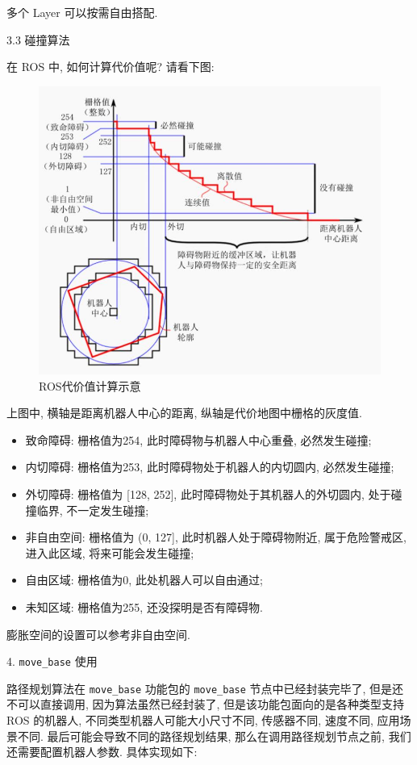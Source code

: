 \documentclass[openany, fontset=windowsold]{ctexbook}
\theoremstyle{kaiti}
\theoremstyle{normal}
\begin{document}
多个 Layer 可以按需自由搭配.

3.3 碰撞算法

在 ROS 中, 如何计算代价值呢? 请看下图:

\begin{figure}[!ht]
  \centering
  \includegraphics[width=.9\textwidth]{ros_demo_nav_compute_collision.jpg}
  \caption{ROS代价值计算示意}
  \label{fig:ros_demo_nav_compute_collision}
\end{figure}

上图中, 横轴是距离机器人中心的距离, 纵轴是代价地图中栅格的灰度值.

\begin{itemize}
  \item 致命障碍: 栅格值为254, 此时障碍物与机器人中心重叠, 必然发生碰撞; 
  \item 内切障碍: 栅格值为253, 此时障碍物处于机器人的内切圆内, 必然发生碰撞; 
  \item 外切障碍: 栅格值为 [128, 252], 此时障碍物处于其机器人的外切圆内, 处于碰撞临界, 不一定发生碰撞; 
  \item 非自由空间: 栅格值为 (0, 127], 此时机器人处于障碍物附近, 属于危险警戒区, 进入此区域, 将来可能会发生碰撞; 
  \item 自由区域: 栅格值为0, 此处机器人可以自由通过; 
  \item 未知区域: 栅格值为255, 还没探明是否有障碍物.
\end{itemize}

膨胀空间的设置可以参考非自由空间.

4. \verb|move_base| 使用

路径规划算法在 \verb|move_base| 功能包的 \verb|move_base| 节点中已经封装完毕了, 但是还不可以直接调用, 因为算法虽然已经封装了, 但是该功能包面向的是各种类型支持 ROS 的机器人, 不同类型机器人可能大小尺寸不同, 传感器不同, 速度不同, 应用场景不同. 最后可能会导致不同的路径规划结果, 那么在调用路径规划节点之前, 我们还需要配置机器人参数. 具体实现如下:
\end{document}
